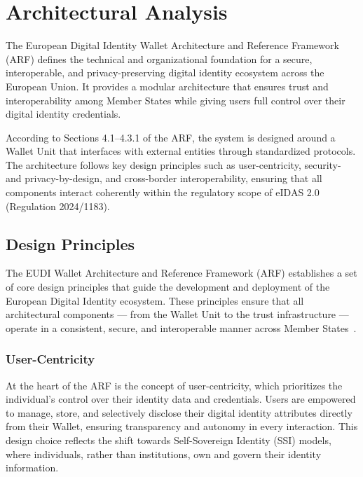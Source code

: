\documentclass[sigconf,balance,nonacm,authordraft]{acmart}
\begin{document}
\section{Architectural Analysis}
\label{sec:ArchitecturalAnalysis}
The European Digital Identity Wallet Architecture and Reference Framework (ARF) defines the technical and organizational foundation for a secure, interoperable, and privacy-preserving digital identity ecosystem across the European Union.
It provides a modular architecture that ensures trust and interoperability among Member States while giving users full control over their digital identity credentials.

According to Sections 4.1–4.3.1 of the ARF, the system is designed around a Wallet Unit that interfaces with external entities through standardized protocols.
The architecture follows key design principles such as user-centricity, security- and privacy-by-design, and cross-border interoperability, ensuring that all components interact coherently within the regulatory scope of eIDAS 2.0 (Regulation 2024/1183).

\subsection{Design Principles}

The EUDI Wallet Architecture and Reference Framework (ARF) establishes a set of core design principles that guide the development and deployment of the European Digital Identity ecosystem. These principles ensure that all architectural components — from the Wallet Unit to the trust infrastructure — operate in a consistent, secure, and interoperable manner across Member States~\cite{EU_ARF2024}.

\subsubsection*{User-Centricity}
At the heart of the ARF is the concept of user-centricity, which prioritizes the individual's control over their identity data and credentials. Users are empowered to manage, store, and selectively disclose their digital identity attributes directly from their Wallet, ensuring transparency and autonomy in every interaction. This design choice reflects the shift towards Self-Sovereign Identity (SSI) models, where individuals, rather than institutions, own and govern their identity information.
\end{document}
